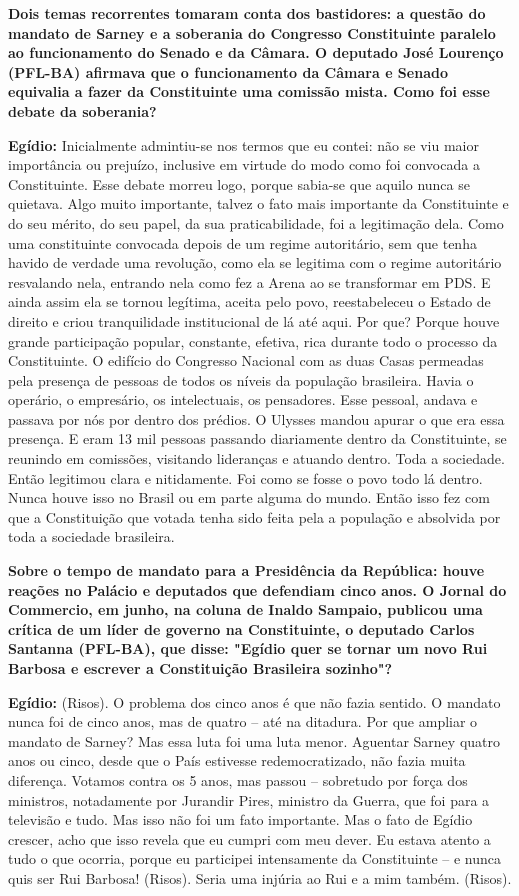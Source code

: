 \textbf{Dois temas recorrentes tomaram conta dos bastidores: a questão
do mandato de Sarney e a soberania do Congresso Constituinte paralelo ao
funcionamento do Senado e da Câmara. O deputado José Lourenço (PFL-BA)
afirmava que o funcionamento da Câmara e Senado equivalia a fazer da
Constituinte uma comissão mista. Como foi esse debate da soberania?}

\textbf{Egídio:} Inicialmente admintiu-se nos termos que eu contei: não
se viu maior importância ou prejuízo, inclusive em virtude do modo como
foi convocada a Constituinte. Esse debate morreu logo, porque sabia-se
que aquilo nunca se quietava. Algo muito importante, talvez o fato mais
importante da Constituinte e do seu mérito, do seu papel, da sua
praticabilidade, foi a legitimação dela. Como uma constituinte convocada
depois de um regime autoritário, sem que tenha havido de verdade uma
revolução, como ela se legitima com o regime autoritário resvalando
nela, entrando nela como fez a Arena ao se transformar em PDS. E ainda
assim ela se tornou legítima, aceita pelo povo, reestabeleceu o Estado
de direito e criou tranquilidade institucional de lá até aqui. Por que?
Porque houve grande participação popular, constante, efetiva, rica
durante todo o processo da Constituinte. O edifício do Congresso
Nacional com as duas Casas permeadas pela presença de pessoas de todos
os níveis da população brasileira. Havia o operário, o empresário, os
intelectuais, os pensadores. Esse pessoal, andava e passava por nós por
dentro dos prédios. O Ulysses mandou apurar o que era essa presença. E
eram 13 mil pessoas passando diariamente dentro da Constituinte, se
reunindo em comissões, visitando lideranças e atuando dentro. Toda a
sociedade. Então legitimou clara e nitidamente. Foi como se fosse o povo
todo lá dentro. Nunca houve isso no Brasil ou em parte alguma do mundo.
Então isso fez com que a Constituição que votada tenha sido feita pela a
população e absolvida por toda a sociedade brasileira.

\textbf{Sobre o tempo de mandato para a Presidência da República: houve
reações no Palácio e deputados que defendiam cinco anos. O Jornal do
Commercio, em junho, na coluna de Inaldo Sampaio, publicou uma crítica
de um líder de governo na Constituinte, o deputado Carlos Santanna
(PFL-BA), que disse: "Egídio quer se tornar um novo Rui Barbosa e
escrever a Constituição Brasileira sozinho"?}

\textbf{Egídio:} (Risos). O problema dos cinco anos é que não fazia
sentido. O mandato nunca foi de cinco anos, mas de quatro -- até na
ditadura. Por que ampliar o mandato de Sarney? Mas essa luta foi uma
luta menor. Aguentar Sarney quatro anos ou cinco, desde que o País
estivesse redemocratizado, não fazia muita diferença. Votamos contra os
5 anos, mas passou -- sobretudo por força dos ministros, notadamente por
Jurandir Pires, ministro da Guerra, que foi para a televisão e tudo. Mas
isso não foi um fato importante. Mas o fato de Egídio crescer, acho que
isso revela que eu cumpri com meu dever. Eu estava atento a tudo o que
ocorria, porque eu participei intensamente da Constituinte -- e nunca
quis ser Rui Barbosa! (Risos). Seria uma injúria ao Rui e a mim também.
(Risos).

